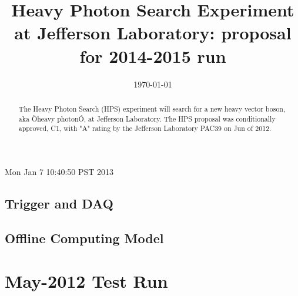 \documentclass[prc,12pt]{revtex4}
\begin{document}
{\color{red} Mon Jan  7 10:40:50 PST 2013 } %

\title{\bf\large{Heavy Photon Search Experiment at Jefferson Laboratory: proposal for 2014-2015 run}}


\date{\today}

\begin{abstract}
\clearpage

The Heavy Photon Search (HPS) experiment will search for a new heavy vector boson, aka Òheavy photonÓ, at Jefferson Laboratory. The HPS proposal was conditionally approved, C1, with "A" rating by the Jefferson Laboratory PAC39  on Jun of 2012. 

\end{abstract}

\maketitle
\clearpage

\tableofcontents
\clearpage






\clearpage





\clearpage






\clearpage


\clearpage


\clearpage


\clearpage

\subsection{Trigger and DAQ }


\subsection{Offline Computing Model}


\section{May-2012 Test Run}
\label{sec:testrun2012}

\clearpage
\end{document}
